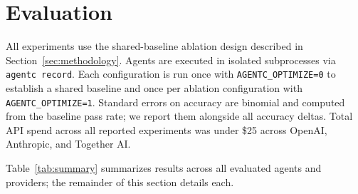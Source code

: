 \section{Evaluation}
\label{sec:eval}

All experiments use the shared-baseline ablation design described in
Section~\ref{sec:methodology}. Agents are executed in isolated subprocesses via
\texttt{agentc record}. Each configuration is run once with
\texttt{AGENTC\_OPTIMIZE=0} to establish a shared baseline and once per ablation
configuration with \texttt{AGENTC\_OPTIMIZE=1}. Standard errors on accuracy are
binomial and computed from the baseline pass rate; we report them alongside all
accuracy deltas. Total API spend across all reported experiments was under \$25
across OpenAI, Anthropic, and Together AI.

Table~\ref{tab:summary} summarizes results across all evaluated agents and providers;
the remainder of this section details each.

